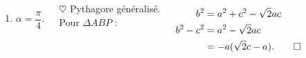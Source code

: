 \documentclass[10pt]{beamer}
\def \heart {\textcolor{blue}{$\heartsuit$} }
\begin{document}
{\begin{columns}[t]
		\begin{enumerate}

		\item $\alpha = \dfrac{\pi}{4}$.
		\end{enumerate}
		\bigskip
		
		\heart Pythagore généralisé. \\ \smallskip
		Pour $\Delta ABP$ :
		

		\begin{align*}	
		b^2 &= a^2 + c^2 - \sqrt{2}ac \\
		b^2 - c^2 &= a^2 - \sqrt{2}ac \\
			  &= -a(\sqrt{2}c-a). \hfill \qed
		\end{align*}

		
	

   
	   \end{columns}
	   }
	  
\end{document}
